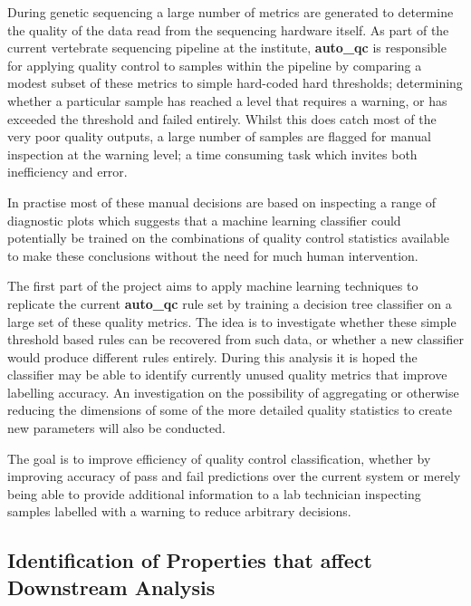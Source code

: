 During genetic sequencing a large number of metrics are generated to determine
the quality of the data read from the sequencing hardware itself. As part of the
current vertebrate sequencing pipeline\citep{github:vr-pipe} at the institute,
\textbf{auto\_qc} is responsible for applying quality control to samples within
the pipeline by comparing a modest subset of these metrics to simple hard-coded
hard thresholds; determining whether a particular sample has reached a level that
requires a warning, or has exceeded the threshold and failed entirely. Whilst
this does catch most of the very poor quality outputs, a large number of samples
are flagged for manual inspection at the warning level; a time consuming task
which invites both inefficiency and error.

In practise most of these manual decisions are based on inspecting a range of
diagnostic plots which suggests that a machine learning classifier could
potentially be trained on the combinations of quality control statistics
available to make these conclusions without the need for much human
intervention\citep{marireport}.

The first part of the project aims to apply machine learning techniques to
replicate the current \textbf{auto\_qc} rule set by training a decision tree
classifier on a large set of these quality metrics. The idea is to investigate
whether these simple threshold based rules can be recovered from such data, or
whether a new classifier would produce different rules entirely. During this
analysis it is hoped the classifier may be able to identify currently unused
quality metrics that improve labelling accuracy. An investigation on the
possibility of aggregating or otherwise reducing the dimensions of some of the
more detailed quality statistics to create new parameters will also be
conducted.

The goal is to improve efficiency of quality control classification, whether by
improving accuracy of pass and fail predictions over the current system or
merely being able to provide additional information to a lab technician
inspecting samples labelled with a warning to reduce arbitrary decisions.

\subsection{Identification of Properties that affect Downstream Analysis}

